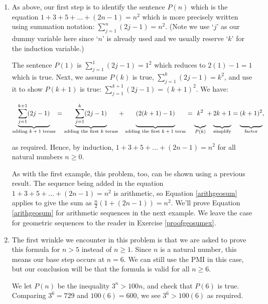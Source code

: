 \documentclass{ximera}
\begin{document}
\begin{ex}
\begin{enumerate}
\item  As above, our first step is to identify the sentence $P(n)$ which is the equation $1 + 3 + 5 + \ldots + (2n-1) = n^2$ which is more precisely written using summation notation: $\displaystyle{ \sum_{j=1}^{n} (2j-1) = n^2}$. (Note we use `$j$' as our dummy variable here since `$n$' is already used and we usually reserve `$k$' for the induction variable.)

The sentence $P(1)$ is $\displaystyle{ \sum_{j=1}^{1} (2j-1) = 1^2}$ which reduces to $2(1)-1 = 1$ which is true.  Next, we assume $P(k)$ is true, $\displaystyle{ \sum_{j=1}^{k} (2j-1) = k^2}$,   and use it to show $P(k+1)$ is true: $\displaystyle{ \sum_{j=1}^{k+1} (2j-1) = (k+1)^2}$.  We have: 

\[ \underbrace{\displaystyle{\sum_{j=1}^{k+1} (2j-1)}}_{\text{adding $k+1$ terms}}  = \underbrace{\displaystyle{\sum_{j=1}^{k} (2j-1)}}_{\text{adding the first $k$ terms}} + \underbrace{(2(k+1)-1) \vphantom{\displaystyle{\sum_{j=1}^{k+1}}}}_{\text{adding the first $k+1$ term}} = \underbrace{k^2 \vphantom{\displaystyle{\sum_{j=1}^{k+1}}}}_{\text{$P(k)$}}+ \underbrace{2k+1 \vphantom{\displaystyle{\sum_{j=1}^{k+1}}}}_{\text{simplify}} =\underbrace{(k+1)^2 \vphantom{\displaystyle{\sum_{j=1}^{k+1}}}}_{\text{factor}} , \]

as required.  Hence, by induction, $1 + 3 + 5 + \ldots + (2n-1) = n^2$ for all natural numbers $n \geq 0$.  

As with the first example, this problem, too, can be shown using a previous result.  The sequence being added in the equation $1 + 3 + 5 + \ldots + (2n-1)=n^2$ is arithmetic, so Equation \ref{arithgeosum} applies to give the sum as $\frac{n}{2} (1 + (2n-1)) = n^2$.  We'll prove Equation \ref{arithgeosum} for arithmetic sequences in the next example. We leave the case for geometric sequences to the reader in Exercise \ref{proofgeosumex}.

\item The first wrinkle we encounter in this problem is that we are asked to prove this formula for $n > 5$ instead of $n \geq 1$.  Since $n$ is a natural number, this means our base step occurs at $n=6$.  We can still use the PMI in this case, but our conclusion will be that the formula is valid for all $n \geq 6$.  

\smallskip

We let $P(n)$ be the inequality  $3^{n} > 100n$, and check that $P(6)$ is true. Comparing $3^6 =  729$ and $100(6) = 600$, we see $3^6 > 100(6)$ as required.  


\end{enumerate}
\end{ex}
\end{document}
